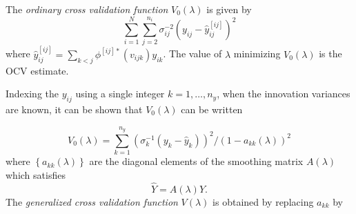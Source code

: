 \documentclass[12pt]{article}
\newtheorem{lemma}[theorem]{Lemma}
\theoremstyle{definition}
\begin{document}
The \emph{ordinary cross validation function} $V_0\left(\lambda\right)$ is given by 
\begin{equation}
\sum_{i=1}^{N} \sum_{j=2}^{n_i} \sigma_{ij}^{-2} \left( y_{ij} -  \hat{y}_{ij}^{\left[ ij \right]}\right)^2
\end{equation}
\bigskip
\noindent
where  $\hat{y}_{ij}^{\left[ ij \right]} = \sum_{k<j}\phi^{\left[ ij \right]*}\left( v_{ijk} \right) y_{ik}$. The value of $\lambda$ minimizing $V_0\left(\lambda\right)$ is the OCV estimate.%
%
%
%
%

Indexing the $y_{ij}$ using a single integer $k = 1, \dots, n_y$, when the innovation variances are known, it can be shown that $V_0\left(\lambda\right)$ can be written 

\begin{equation}
V_0\left(\lambda\right) = \sum_{k=1}^{n_y} \left(\sigma_{k}^{-1} \left(y_k - \hat{y}_k\right) \right)^2/ \left(1-a_{kk}\left(\lambda\right)  \right)^2
\end{equation} 
\bigskip
\noindent
where $\left\{ a_{kk}\left( \lambda \right) \right\}$ are the diagonal elements of the smoothing matrix $A\left( \lambda \right)$ which satisfies
\[
\hat{Y} = A\left(\lambda\right) Y.
\]
\bigskip
The \emph{generalized cross validation function} $V\left(\lambda\right)$ is obtained by replacing $a_{kk}$ by 
\end{document}
